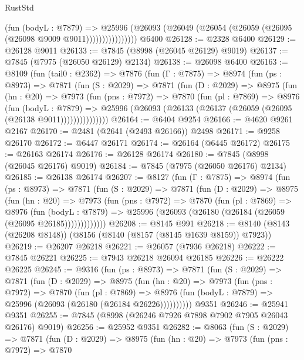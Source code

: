 \begin{lexlean}{RustStd}
\begin{coremodule}
                      (fun (bodyL : @7879) =>
                      @25996
                        (@26093 (@26049 (@26054 (@26059 (@26095 (@26098 @9009 @9011))))))))))))))))
    @6400
@26128 := @2328 @6400
@26129 := @26128 @9011
@26133 := @7845 (@8998 (@26045 @26129) @9019)
@26137 := @7845 (@7975 (@26050 @26129) @2134)
@26138 := @26098 @6400
@26163 := @8109
    (fun (tail0 : @2362) =>
    @7876
      (fun (Γ : @7875) =>
      @8974
        (fun (ps : @8973) =>
        @7871
          (fun (S : @2029) =>
          @7871
            (fun (D : @2029) =>
            @8975
              (fun (hn : @20) =>
              @7973
                (fun (pns : @7972) =>
                @7870
                  (fun (pl : @7869) =>
                  @8976
                    (fun (bodyL : @7879) =>
                    @25996 (@26093 (@26133 (@26137 (@26059 (@26095 (@26138 @9011)))))))))))))))
@26164 := @6404 @9254
@26166 := @4620 @9261 @2167
@26170 := @2481 (@2641 (@2493 @26166)) @2498
@26171 := @9258 @26170
@26172 := @6447 @26171
@26174 := @26164 (@6445 @26172)
@26175 := @26163 @26174
@26176 := @26128 @26174
@26180 := @7845 (@8998 (@26045 @26176) @9019)
@26184 := @7845 (@7975 (@26050 @26176) @2134)
@26185 := @26138 @26174
@26207 := @8127
    (fun (Γ : @7875) =>
    @8974
      (fun (ps : @8973) =>
      @7871
        (fun (S : @2029) =>
        @7871
          (fun (D : @2029) =>
          @8975
            (fun (hn : @20) =>
            @7973
              (fun (pns : @7972) =>
              @7870
                (fun (pl : @7869) =>
                @8976
                  (fun (bodyL : @7879) =>
                  @25996 (@26093 (@26180 (@26184 (@26059 (@26095 @26185)))))))))))))
@26208 := @8145 @991
@26218 := @8140 (@8143 (@26208 @8148)) (@8156 (@8140 (@8157 (@8145 @1639 @8159)) @7923))
@26219 := @26207 @26218
@26221 := @26057 (@7936 @26218)
@26222 := @7845 @26221
@26225 := @7943 @26218 @26094 @26185
@26226 := @26222 @26225
@26245 := @9316
    (fun (ps : @8973) =>
    @7871
      (fun (S : @2029) =>
      @7871
        (fun (D : @2029) =>
        @8975
          (fun (hn : @20) =>
          @7973
            (fun (pns : @7972) =>
            @7870
              (fun (pl : @7869) =>
              @8976 (fun (bodyL : @7879) => @25996 (@26093 (@26180 (@26184 @26226))))))))))
    @9351
@26246 := @25941 @9351
@26255 := @7845 (@8998 (@26246 @7926 @7898 @7902 @7905 @26043 @26176) @9019)
@26256 := @25952 @9351
@26282 := @8063
    (fun (S : @2029) =>
    @7871
      (fun (D : @2029) =>
      @8975
        (fun (hn : @20) =>
        @7973
          (fun (pns : @7972) =>
          @7870

\end{coremodule}
\end{lexlean}
